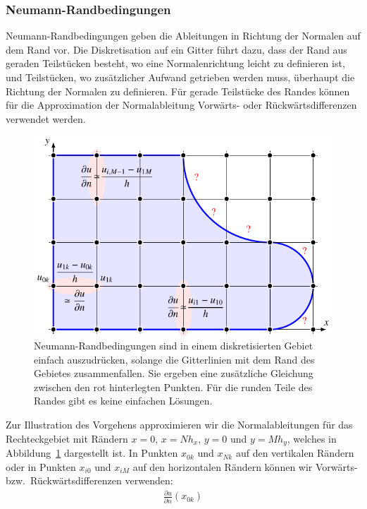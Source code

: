 \subsubsection{Neumann-Randbedingungen}
Neumann-Randbedingungen geben die Ableitungen in Richtung der Normalen
auf dem Rand vor.
Die Diskretisation auf ein Gitter führt dazu, dass der Rand aus geraden
Teilstücken besteht, wo eine Normalenrichtung leicht zu definieren ist,
und Teilstücken, wo zusätzlicher Aufwand getrieben werden muss, überhaupt
die Richtung der Normalen zu definieren.
Für gerade Teilstücke des Randes können für die Approximation der
Normalableitung Vorwärts- oder Rückwärtsdifferenzen verwendet
werden.

\begin{beispiel}
\begin{figure}
\centering
\includegraphics{chapters/70-pde/images/neumann.pdf}
\caption{Neumann-Randbedingungen sind in einem diskretisierten Gebiet 
einfach auszudrücken, solange die Gitterlinien mit dem Rand des 
Gebietes zusammenfallen.
Sie ergeben eine zusätzliche Gleichung zwischen den rot hinterlegten
Punkten.
Für die runden Teile des Randes gibt es keine einfachen Lösungen.
\label{buch:pde:neumann-analysis}}
\end{figure}
Zur Illustration des Vorgehens approximieren wir die Normalableitungen
für das Rechteckgebiet mit Rändern $x=0$, $x=Nh_x$, $y=0$ und $y=Mh_y$,
welches in Abbildung~\ref{buch:pde:neumann-analysis} dargestellt ist.
In Punkten $x_{0k}$ und $x_{Nk}$ auf den vertikalen Rändern
oder in Punkten $x_{i0}$ und $x_{iM}$ auf den horizontalen Rändern
können wir Vorwärts- bzw.~Rückwärtsdifferenzen verwenden:
\begin{align*}
\frac{\partial u}{\partial n}(x_{0k})

\end{align*}
\end{beispiel}
